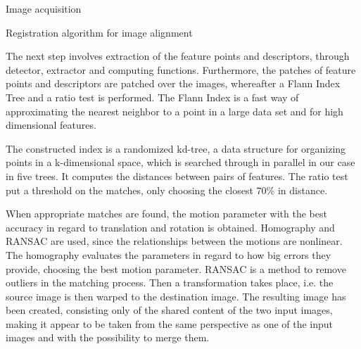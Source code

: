 \documentclass[10pt]{article}
\begin{document}
\begin{section}{Image acquisition}
\begin{subsection}{Registration algorithm for image alignment}
        \medskip

        The next step involves extraction of the feature points and descriptors, through detector, extractor and computing functions. Furthermore, the patches of feature points and descriptors are patched over the images, whereafter a Flann Index Tree and a ratio test is performed. The Flann Index is a fast way of approximating the nearest neighbor to a point in a large data set and for high dimensional features.

        \medskip

        The constructed index is a randomized kd-tree, a data structure for organizing points in a k-dimensional space, which is searched through in parallel in our case in five trees. It computes the distances between pairs of features. The ratio test put a threshold on the matches, only choosing the closest 70\% in distance.

        \medskip

        When appropriate matches are found, the motion parameter with the best accuracy in regard to translation and rotation is obtained. Homography and RANSAC are used, since the relationships between the motions are nonlinear. The homography evaluates the parameters in regard to how big errors they provide, choosing the best motion parameter. RANSAC is a method to remove outliers in the matching process. Then a transformation takes place, i.e. the source image is then warped to the destination image. The resulting image has been created, consisting only of the shared content of the two input images, making it appear to be taken from the same perspective as one of the input images and with the possibility to merge them.

    \end{subsection} %
\end{section}
\end{document}
